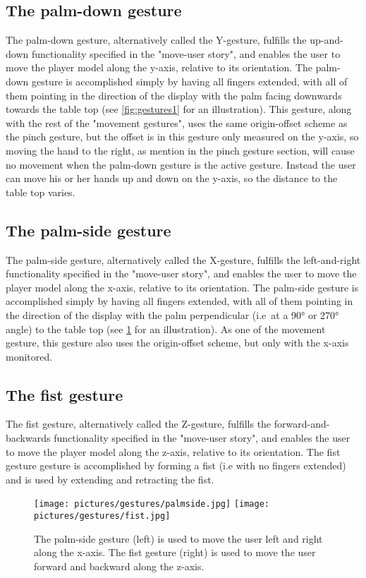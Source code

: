 \subsection{The palm-down gesture}
The palm-down gesture, alternatively called the Y-gesture, fulfills the up-and-down functionality specified in the "move-user story", and enables the user to 
move the player model along the y-axis, relative to its orientation. The palm-down gesture is accomplished simply by having all fingers extended, with all of them pointing in
the direction of the display with the palm facing downwards towards the table top (see \ref{fig:gestures1} for an illustration). This gesture, along with the rest of the 
"movement gestures", uses the same origin-offset scheme as the pinch gesture, but the offset is in this gesture only measured on the y-axis, so moving the hand to the 
right, as mention in the pinch gesture section, will cause no movement when the palm-down gesture is the active gesture. 
Instead the user can move his or her hands up and down on the y-axis, so the distance to the table top varies.  

\subsection{The palm-side gesture}
The palm-side gesture, alternatively called the X-gesture, fulfills the left-and-right functionality specified in the "move-user story", and enables the user to 
move the player model along the x-axis, relative to its orientation. The palm-side gesture is accomplished simply by having all fingers extended, with all of them pointing in
the direction of the display with the palm perpendicular (i.e~at a 90° or 270° angle) to the table top (see \ref{fig:gestures2} for an illustration). 
As one of the movement gesture, this gesture also uses the origin-offset scheme, but only with the x-axis monitored.

\subsection{The fist gesture}
The fist gesture, alternatively called the Z-gesture, fulfills the forward-and-backwards functionality specified in the "move-user story", and enables the user to 
move the player model along the z-axis, relative to its orientation. The fist gesture gesture is accomplished by forming a fist (i.e with no fingers extended)
and is used by extending and retracting the fist. 

\begin{figure}%
	\texttt{[image: pictures/gestures/palmside.jpg]}
    \texttt{[image: pictures/gestures/fist.jpg]}
	\caption[The palm-side and fist gestures]{The palm-side gesture (left) is used to move the user left and right along the x-axis. 
             The fist gesture (right) is used to move the user forward and backward along the z-axis.}
	\label{fig:gestures2}
\end{figure} 

